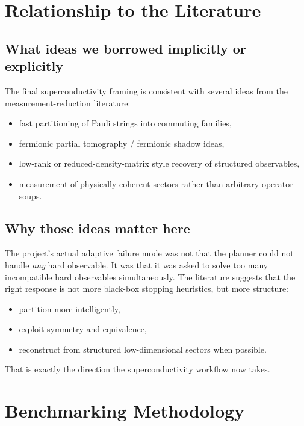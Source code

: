 \documentclass[11pt]{article}
\begin{document}
\section{Relationship to the Literature}

\subsection{What ideas we borrowed implicitly or explicitly}

The final superconductivity framing is consistent with several ideas from the measurement-reduction literature:

\begin{itemize}
\item fast partitioning of Pauli strings into commuting families,
\item fermionic partial tomography / fermionic shadow ideas,
\item low-rank or reduced-density-matrix style recovery of structured observables,
\item measurement of physically coherent sectors rather than arbitrary operator soups.
\end{itemize}

\subsection{Why those ideas matter here}

The project's actual adaptive failure mode was not that the planner could not handle \emph{any} hard observable. It was that it was asked to solve too many incompatible hard observables simultaneously. The literature suggests that the right response is not more black-box stopping heuristics, but more structure:

\begin{itemize}
\item partition more intelligently,
\item exploit symmetry and equivalence,
\item reconstruct from structured low-dimensional sectors when possible.
\end{itemize}

That is exactly the direction the superconductivity workflow now takes.

\section{Benchmarking Methodology}
\end{document}
